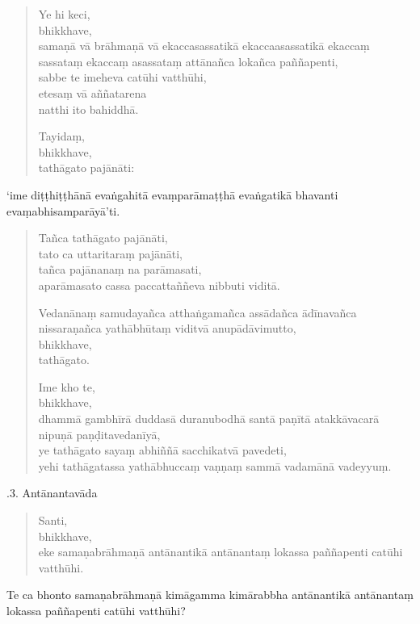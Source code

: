 \documentclass[11pt,twoside,openright]{book}
\begin{document}
\begin{verse}
Ye hi keci,\\
\vin  bhikkhave,\\
\vin  samaṇā vā brāhmaṇā vā ekaccasassatikā ekaccaasassatikā ekaccaṃ sassataṃ ekaccaṃ asassataṃ attānañca lokañca paññapenti,\\
\vin  sabbe te imeheva catūhi vatthūhi,\\
\vin  etesaṃ vā aññatarena\\
 natthi ito bahiddhā.

Tayidaṃ,\\
\vin  bhikkhave,\\
\vin  tathāgato pajānāti:

\end{verse}
\pstart
‘ime diṭṭhiṭṭhānā evaṅgahitā evaṃparāmaṭṭhā evaṅgatikā bhavanti evaṃabhisamparāyā’ti.
\pend

\begin{verse}
Tañca tathāgato pajānāti,\\
\vin  tato ca uttaritaraṃ pajānāti,\\
\vin  tañca pajānanaṃ na parāmasati,\\
\vin  aparāmasato cassa paccattaññeva nibbuti viditā.

Vedanānaṃ samudayañca atthaṅgamañca assādañca ādīnavañca nissaraṇañca yathābhūtaṃ viditvā anupādāvimutto,\\
\vin  bhikkhave,\\
\vin  tathāgato.

Ime kho te,\\
\vin  bhikkhave,\\
\vin  dhammā gambhīrā duddasā duranubodhā santā paṇītā atakkāvacarā nipuṇā paṇḍitavedanīyā,\\
\vin  ye tathāgato sayaṃ abhiññā sacchikatvā pavedeti,\\
\vin  yehi tathāgatassa yathābhuccaṃ vaṇṇaṃ sammā vadamānā vadeyyuṃ.

\end{verse}
.3. Antānantavāda
\pend

\begin{verse}
Santi,\\
\vin  bhikkhave,\\
\vin  eke samaṇabrāhmaṇā antānantikā antānantaṃ lokassa paññapenti catūhi vatthūhi.

\end{verse}
\pstart
Te ca bhonto samaṇabrāhmaṇā kimāgamma kimārabbha antānantikā antānantaṃ lokassa paññapenti catūhi vatthūhi?
\pend
\end{document}
